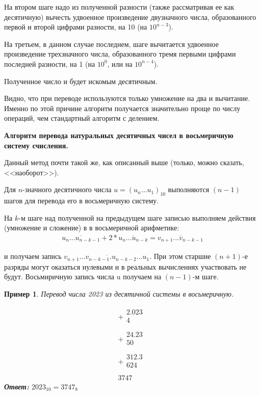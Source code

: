 \documentclass[14pt, russian]{scrartcl}
\newcounter{cExample}
\newtheorem{Example}{Пример}[cExample]
\begin{document}
На втором шаге надо из полученной разности (также рассматривая ее как десятичную) вычесть удвоенное произведение двузначного числа, образованного первой и второй цифрами разности, на 10 (на $10^{n-3}$).

На третьем, в данном случае последнем, шаге вычитается удвоенное произведение трехзначного числа, образованного тремя первыми цифрами последней разности, на 1 (на $10^0$, или на $10^{n-4}$).

Полученное число и будет искомым десятичным.

Видно, что при переводе используются только умножение на два и вычитание. Именно по этой причине алгоритм получается значительно проще по числу операций, чем стандартный алгоритм с делением.

\vspace{1em}
\textbf{Алгоритм перевода натуральных десятичных чисел в восьмеричную систему счисления.}

Данный метод почти такой же, как описанный выше (только,
можно сказать, <<наоборот>>).

Для $n$-значного десятичного числа $u = (u_n...u_1)_{10}$ выполняются $(n - 1)$ шагов для перевода его в восьмеричную систему.

На $k$-м шаге над полученной на предыдущем шаге записью выполняем действия (умножение и сложение) в в восьмеричной арифметике:
\label{Example:MathFont6} 
\begin{equation*}\label{eq:5}
\begin{aligned}
\overline{u_n ... u_{n-k-1}} + 2 * \overline{u_n ... u_{n-k}} = \overline{v_{n+1} ... v_{n-k-1}}
\end{aligned}
\end{equation*} 

и получаем запись $\overline{v_{n+1} ... v_{n-k-1}.u_{n-k-2} ... u_1}$. При этом старшие $(n + 1)$-е разряды могут оказаться нулевыми и в реальных вычислениях участвовать не будут. Восьмиричную запись числа u получаем на $(n - 1)$-м шаге.

\begin{Example}\label{Example:MathFont7}
Перевод числа 2023 из десятичной системы в восьмеричную. 

$$
\begin{array}{r}
+
\begin{array}{r}
2.023\\
4\quad\quad\\
\end{array} \\
\hline
+
\begin{array}{r}
24.23\\
50\,\,\,\,\\
\end{array} \\
\hline
+
\begin{array}{r}
312.3\\
624\\
\end{array} \\
\hline
3747\,\,\,
\end{array}
$$
\textbf{Ответ:} $2023_{10} = 3747_8$ 
\end{Example} 
\end{document}
